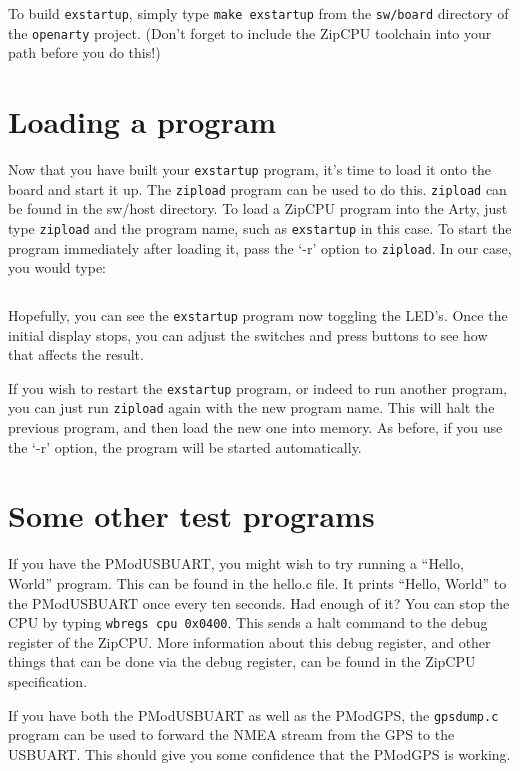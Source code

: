 \documentclass{gqtekspec}
\begin{document}
To build {\tt exstartup}, simply type {\tt make exstartup} from the 
{\tt sw/board} directory of the {\tt openarty} project.  (Don't forget to
include the ZipCPU toolchain into your path before you do this!)

\section{Loading a program}
Now that you have built your {\tt exstartup} program, it's time to load it
onto the board and start it up.  The {\tt zipload} program can be used to
do this.  {\tt zipload} can be found in the sw/host directory.  To load a
ZipCPU program into the Arty, just type {\tt zipload} and the program name,
such as {\tt exstartup} in this case.  To start the program immediately
after loading it, pass the `-r' option to {\tt zipload}.  In our case, you
would type:
\begin{lstlisting}[language=bash]
% zipload -r exstartup
\end{lstlisting}

Hopefully, you can see the {\tt exstartup} program now toggling the LED's.
Once the initial display stops, you can adjust the switches and press buttons
to see how that affects the result.

If you wish to restart the {\tt exstartup} program, or indeed to run another
program, you can just run {\tt zipload} again with the new program name.  This
will halt the previous program, and then load the new one into memory.  As 
before, if you use the `-r' option, the program will be started automatically.

\section{Some other test programs}
If you have the PModUSBUART, you might wish to try running a ``Hello, World''
program.  This can be found in the hello.c file.  It prints ``Hello, World''
to the PModUSBUART once every ten seconds.  Had enough of it?  You can stop
the CPU by typing {\tt wbregs cpu 0x0400}.  This sends a halt command to the
debug register of the ZipCPU.  More information about this debug register, and
other things that can be done via the debug register, can be found in the
ZipCPU specification.

If you have both the PModUSBUART as well as the PModGPS, the {\tt gpsdump.c}
program can be used to forward the NMEA stream from the GPS to the USBUART. 
This should give you some confidence that the PModGPS is working.
\end{document}
